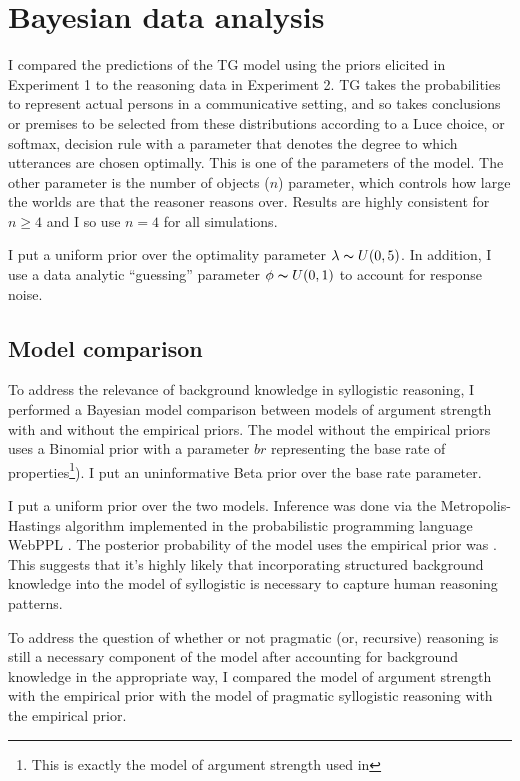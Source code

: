\documentclass{llncs} %
\begin{document}
\section{Bayesian data analysis}

I compared the predictions of the TG model using the priors elicited in Experiment 1 to the reasoning data in Experiment 2. TG takes the probabilities to represent actual persons in a communicative setting, and so takes conclusions or premises to be selected from these distributions according to a Luce choice, or softmax, decision rule with a parameter that denotes the degree to which utterances are chosen optimally\cite{Luce1959}. This is one of the parameters of the model. The other parameter is the number of objects ($n$) parameter, which controls how large the worlds are that the reasoner reasons over. Results are highly consistent for $n \geq 4$ and I so use $n=4$ for all simulations.  

I put a uniform prior over the optimality parameter $\lambda \thicksim U(0,5)$. In addition, I use a data analytic ``guessing'' parameter $\phi \thicksim U(0,1)$ to account for response noise.

\subsection{Model comparison}

To address the relevance of background knowledge in syllogistic reasoning, I performed a Bayesian model comparison between models of argument strength with and without the empirical priors. The model without the empirical priors uses a Binomial prior with a parameter $br$ representing the base rate of properties\footnote{This is exactly the model of argument strength used in }). I put an uninformative Beta prior over the base rate parameter.

I put a uniform prior over the two models. Inference was done via the Metropolis-Hastings algorithm implemented in the probabilistic programming language WebPPL \cite{dippl}. The posterior probability of the model uses the empirical prior was . This suggests that it's highly likely that incorporating structured background knowledge into the model of syllogistic is necessary to capture human reasoning patterns.

To address the question of whether or not pragmatic (or, recursive) reasoning is still a necessary component of the model after accounting for background knowledge in the appropriate way, I compared the model of argument strength with the empirical prior with the model of pragmatic syllogistic reasoning with the empirical prior. 
\end{document}
